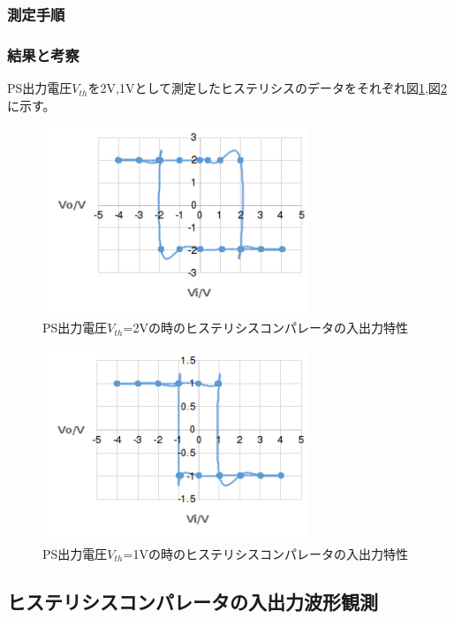 \documentclass[11pt,a4j]{jsarticle}
\begin{document}
   \subsubsection{測定手順}
    
    
   \subsubsection{結果と考察}
    PS出力電圧$V_{th}$を2V,1Vとして測定したヒステリシスのデータをそれぞれ図\ref{fig:1_2_histeri_Vth2},図\ref{fig:1_2_histeri_Vth1}に示す。
    
    \begin{figure}[htbp]
  \centering
  \includegraphics[width=8cm,clip]{1_2_histeri_Vth2.png}
  \caption{PS出力電圧$V_{th}$=2Vの時のヒステリシスコンパレータの入出力特性}
  \label{fig:1_2_histeri_Vth2}
 \end{figure}%
    
 \begin{figure}[htbp]
  \centering
  \includegraphics[width=8cm,clip]{1_2_histeri_Vth1.png}
  \caption{PS出力電圧$V_{th}$=1Vの時のヒステリシスコンパレータの入出力特性}
  \label{fig:1_2_histeri_Vth1}
 \end{figure}%
    
    
    
  \subsection{ヒステリシスコンパレータの入出力波形観測}
\end{document}
